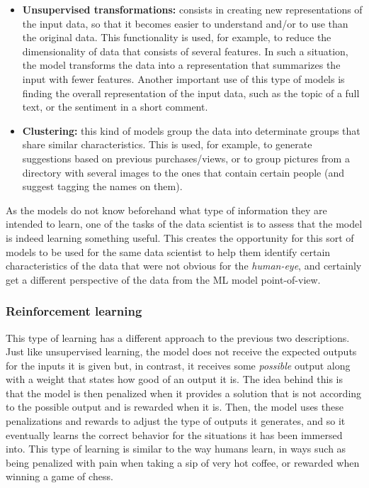 \begin{itemize}
    \item \textbf{Unsupervised transformations:} consists in creating new representations of the input data, so that it becomes easier to understand and/or to use than the original data. This functionality is used, for example, to reduce the dimensionality of data that consists of several features. In such a situation, the model transforms the data into a representation that summarizes the input with fewer features. Another important use of this type of models is finding the overall representation of the input data, such as the topic of a full text, or the sentiment in a short comment.
    \item \textbf{Clustering:} this kind of models group the data into determinate groups that share similar characteristics. This is used, for example, to generate suggestions based on previous purchases/views, or to group pictures from a directory with several images to the ones that contain certain people (and suggest tagging the names on them).
\end{itemize}

As the models do not know beforehand what type of information they are intended to learn, one of the tasks of the data scientist is to assess that the model is indeed learning something useful. This creates the opportunity for this sort of models to be used for the same data scientist to help them identify certain characteristics of the data that were not obvious for the \emph{human-eye}, and certainly get a different perspective of the data from the \ac{ML} model point-of-view.

\subsubsection{Reinforcement learning}
This type of learning has a different approach to the previous two descriptions. Just like unsupervised learning, the model does not receive the expected outputs for the inputs it is given but, in contrast, it receives some \emph{possible} output along with a weight that states how good of an output it is. The idea behind this is that the model is then penalized when it provides a solution that is not according to the possible output and is rewarded when it is. Then, the model uses these penalizations and rewards to adjust the type of outputs it generates, and so it eventually learns the correct behavior for the situations it has been immersed into. This type of learning is similar to the way humans learn, in ways such as being penalized with pain when taking a sip of very hot coffee, or rewarded when winning a game of chess.\\

